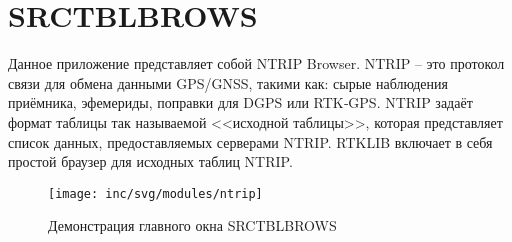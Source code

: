 \section{SRCTBLBROWS}
Данное приложение представляет собой NTRIP Browser. NTRIP -- это протокол связи для обмена данными GPS/GNSS, такими как: сырые наблюдения приёмника, эфемериды, поправки для DGPS или RTK‐GPS. NTRIP задаёт формат таблицы так называемой <<исходной таблицы>>, которая представляет список данных, предоставляемых серверами NTRIP. RTKLIB включает в себя простой браузер для исходных таблиц NTRIP\cite{rtklib}.
\begin{figure}[ht]
	\centering
	\texttt{[image: inc/svg/modules/ntrip]}
	\caption{Демонстрация главного окна SRCTBLBROWS}
	\label{fig:ntrip}
\end{figure}


